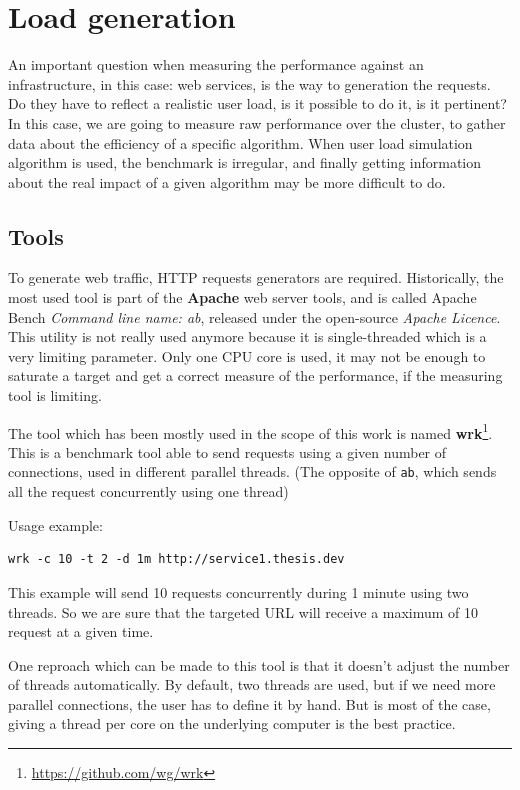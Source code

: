 \section{Load generation}

An important question when measuring the performance against an infrastructure,
in this case: web services, is the way to generation the requests. Do they
have to reflect a realistic user load, is it possible to do it, is it pertinent?
In this case, we are going to measure raw performance over the cluster, to gather
data about the efficiency of a specific algorithm. When user load simulation algorithm
is used, the benchmark is irregular, and finally getting information about
the real impact of a given algorithm may be more difficult to do.

\subsection{Tools}

To generate web traffic, HTTP requests generators are required. Historically,
the most used tool is part of the \textbf{Apache} web server tools, and is
called Apache Bench \textit{Command line name: ab}, released under the open-source
\textit{Apache Licence}. This utility is not really
used anymore because it is single-threaded which is a very limiting parameter.
Only one CPU core is used, it may not be enough to saturate a target and get a
correct measure of the performance, if the measuring tool is limiting.

The tool which has been mostly used in the scope of this work is named
\textbf{wrk}\footnote{\url{https://github.com/wg/wrk}}. This is a benchmark
tool able to send requests using a given number of connections, used in
different parallel threads. (The opposite of \texttt{ab}, which sends all
the request concurrently using one thread)

Usage example:

\vspace{1em}
\begin{lstlisting}
wrk -c 10 -t 2 -d 1m http://service1.thesis.dev
\end{lstlisting}

This example will send 10 requests concurrently during 1 minute using two threads.
So we are sure that the targeted URL will receive a maximum of 10 request at a
given time.

One reproach which can be made to this tool is that it doesn't adjust the
number of threads automatically. By default, two threads are used, but if we
need more parallel connections, the user has to define it by hand. But is most
of the case, giving a thread per core on the underlying computer is the
best practice.


